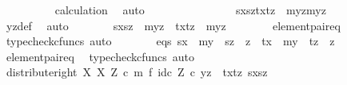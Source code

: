 \begin{isabellebody}
\ \ \ \ \ \ \ \ \isamarkupfalse%
\ calculation\ \isamarkupfalse%
\ auto\isanewline
\ \ \ \ \isamarkupfalse%
\ \ \ \isanewline
\ \ \ \ \isamarkupfalse%
\ \isamarkupfalse%
\ {\isachardoublequoteopen}{\isasymlangle}{\isasymlangle}sx{\isacharcomma}{\kern0pt}sz{\isasymrangle}{\isacharcomma}{\kern0pt}{\isasymlangle}tx{\isacharcomma}{\kern0pt}tz{\isasymrangle}{\isasymrangle}\ {\isacharequal}{\kern0pt}\ {\isasymlangle}{\isasymlangle}my{}{\isacharcomma}{\kern0pt}z{\isasymrangle}{\isacharcomma}{\kern0pt}{\isasymlangle}my{}{\isacharcomma}{\kern0pt}z{\isasymrangle}{\isasymrangle}{\isachardoublequoteclose}\isanewline
\ \ \ \ \ \ \isamarkupfalse%
\ yz{\isacharunderscore}{\kern0pt}def\ \isamarkupfalse%
\ auto\isanewline
\ \ \ \ \isamarkupfalse%
\ \isamarkupfalse%
\ {\isachardoublequoteopen}{\isasymlangle}sx{\isacharcomma}{\kern0pt}sz{\isasymrangle}\ {\isacharequal}{\kern0pt}\ {\isasymlangle}my{}{\isacharcomma}{\kern0pt}z{\isasymrangle}\ {\isasymand}\ {\isasymlangle}tx{\isacharcomma}{\kern0pt}tz{\isasymrangle}\ {\isacharequal}{\kern0pt}\ {\isasymlangle}my{}{\isacharcomma}{\kern0pt}z{\isasymrangle}{\isachardoublequoteclose}\isanewline
\ \ \ \ \ \ \isamarkupfalse%
\ element{\isacharunderscore}{\kern0pt}pair{\isacharunderscore}{\kern0pt}eq\ \isamarkupfalse%
\ {\isacharparenleft}{\kern0pt}typecheck{\isacharunderscore}{\kern0pt}cfuncs{\isacharcomma}{\kern0pt}\ auto{\isacharparenright}{\kern0pt}\isanewline
\ \ \ \ \isamarkupfalse%
\ \isamarkupfalse%
\ eqs{\isacharcolon}{\kern0pt}\ {\isachardoublequoteopen}sx\ {\isacharequal}{\kern0pt}\ my{}\ {\isasymand}\ sz\ {\isacharequal}{\kern0pt}\ z\ {\isasymand}\ tx\ {\isacharequal}{\kern0pt}\ my{}\ {\isasymand}\ tz\ {\isacharequal}{\kern0pt}\ z{\isachardoublequoteclose}\isanewline
\ \ \ \ \ \ \isamarkupfalse%
\ element{\isacharunderscore}{\kern0pt}pair{\isacharunderscore}{\kern0pt}eq\ \isamarkupfalse%
\ {\isacharparenleft}{\kern0pt}typecheck{\isacharunderscore}{\kern0pt}cfuncs{\isacharcomma}{\kern0pt}\ auto{\isacharparenright}{\kern0pt}\isanewline
\isanewline
\ \ \ \ \isamarkupfalse%
\ {\isachardoublequoteopen}{\isacharparenleft}{\kern0pt}distribute{\isacharunderscore}{\kern0pt}right\ X\ X\ Z\ {\isasymcirc}\isactrlsub c\ {\isacharparenleft}{\kern0pt}m\ {\isasymtimes}\isactrlsub f\ id\isactrlsub c\ Z{\isacharparenright}{\kern0pt}{\isacharparenright}{\kern0pt}\ {\isasymcirc}\isactrlsub c\ {\isasymlangle}y{\isacharprime}{\kern0pt}{\isacharcomma}{\kern0pt}z{\isasymrangle}\ {\isacharequal}{\kern0pt}\ {\isasymlangle}{\isasymlangle}tx{\isacharcomma}{\kern0pt}tz{\isasymrangle}{\isacharcomma}{\kern0pt}\ {\isasymlangle}sx{\isacharcomma}{\kern0pt}sz{\isasymrangle}{\isasymrangle}{\isachardoublequoteclose}\isanewline

\end{isabellebody}

